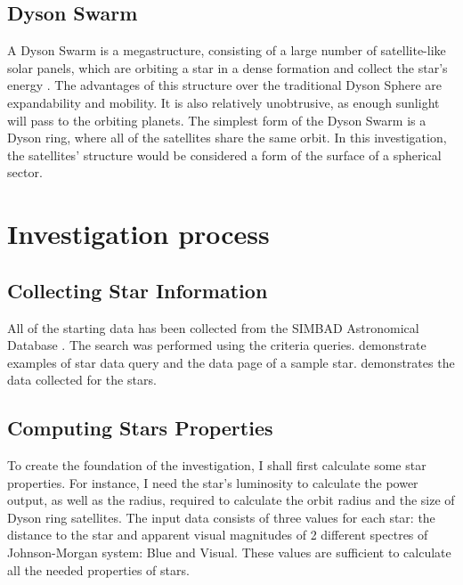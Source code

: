 \documentclass[stu, 11pt, a4paper, floatsintext, noextraspace]{apa7}
\begin{document}
	\subsection{Dyson Swarm}
	A Dyson Swarm is a megastructure, consisting of a large number of satellite-like solar panels, which are orbiting a star in a dense formation and collect the star's energy \Parencite{kochai_pioneering_2020}. The advantages of this structure over the traditional Dyson Sphere are expandability and mobility. It is also relatively unobtrusive, as enough sunlight will pass to the orbiting planets. The simplest form of the Dyson Swarm is a Dyson ring, where all of the satellites share the same orbit. In this investigation, the satellites' structure would be considered a form of the surface of a spherical sector.
	\section{Investigation process}
	\subsection{Collecting Star Information}
	All of the starting data has been collected from the SIMBAD Astronomical Database \Parencite{wenger_simbad_2000}. The search was performed using the criteria queries.  demonstrate examples of star data query and the data page of a sample star.  demonstrates the data collected for the stars.
	\subsection{Computing Stars Properties}
	To create the foundation of the investigation, I shall first calculate some star properties. For instance, I need the star's luminosity to calculate the power output, as well as the radius, required to calculate the orbit radius and the size of Dyson ring satellites. The input data consists of three values for each star: the distance to the star and apparent visual magnitudes of 2 different spectres of Johnson-Morgan system: Blue and Visual. These values are sufficient to calculate all the needed properties of stars.
\end{document}
